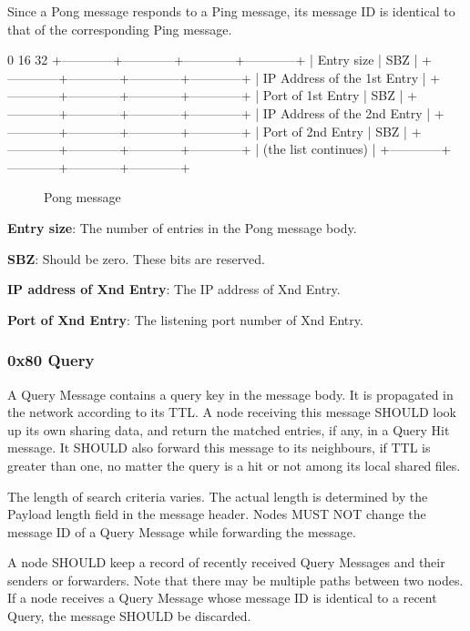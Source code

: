 \documentclass[12pt, a4paper]{article}
\begin{document}
Since a Pong message responds to a Ping message, its message ID is identical to that of the corresponding Ping message.

\begin{verbbox}
0                         16                        32
+------------+------------+------------+------------+
|        Entry size       |           SBZ           |
+------------+------------+------------+------------+
|               IP Address of the 1st Entry         |
+------------+------------+------------+------------+
|   Port of 1st Entry     |    	      SBZ           |
+------------+------------+------------+------------+
|               IP Address of the 2nd Entry         |
+------------+------------+------------+------------+
|   Port of 2nd Entry     |    	      SBZ           |
+------------+------------+------------+------------+
|   (the list continues)                            |
+------------+------------+------------+------------+
\end{verbbox}

\begin{figure}[h!]
  \centering
  \theverbbox
  \label{pong}
  \caption{Pong message}
\end{figure}

\textbf{Entry size}: The number of entries in the Pong message body.

\textbf{SBZ}: Should be zero. These bits are reserved.

\textbf{IP address of Xnd Entry}: The IP address of Xnd Entry.

\textbf{Port of Xnd Entry}: The listening port number of Xnd Entry.

\subsubsection{0x80 Query}
A Query Message contains a query key in the message body.
It is propagated in the network according to its TTL.
A node receiving this message SHOULD look up its own sharing data, and return the matched entries, if any, in a Query Hit message.
It SHOULD also forward this message to its neighbours, if TTL is greater than one, no matter the query is a hit or not among its local shared files.

The length of search criteria varies. The actual length is determined by the Payload length field in the message header.
Nodes MUST NOT change the message ID of a Query Message while forwarding the message.

A node SHOULD keep a record of recently received Query Messages and their senders or forwarders.
Note that there may be multiple paths between two nodes.
If a node receives a Query Message whose message ID is identical to a recent Query, the message SHOULD be discarded.
\end{document}
